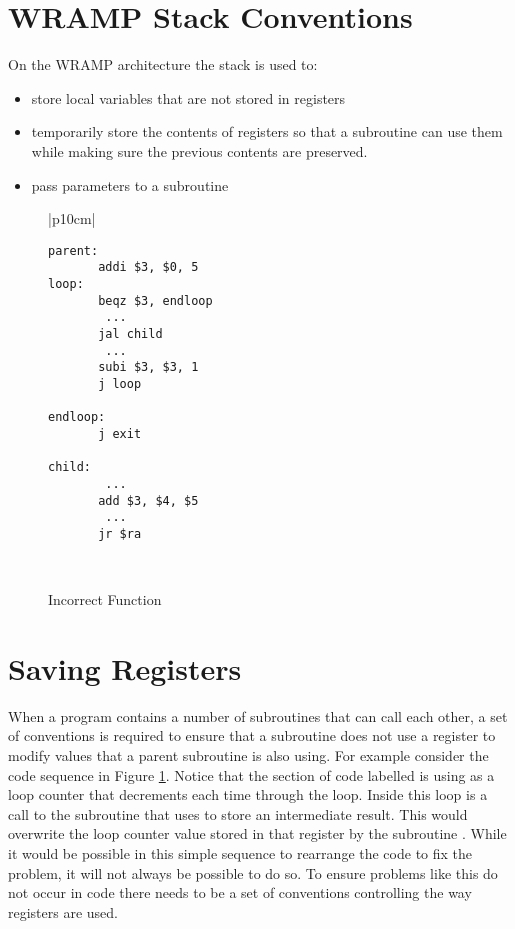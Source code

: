 \section{WRAMP Stack Conventions}
On the WRAMP architecture the stack is used to:

\begin{itemize}
\item store local variables that are not stored in registers
\item temporarily store the contents of registers so that a subroutine can use them while making sure the previous contents are preserved.
\item pass parameters to a subroutine
\end{itemize}

%
%
\begin{figure}[!hbt]
\begin{footnotesize}
\begin{center}
\begin{tabular}{|p{10cm}|}
\hline
\begin{verbatim}
parent:
       addi $3, $0, 5
loop:
       beqz $3, endloop
        ...
       jal child
        ...
       subi $3, $3, 1
       j loop

endloop:
       j exit

child:
        ...
       add $3, $4, $5
        ...
       jr $ra
\end{verbatim}
\\
\hline
\end{tabular}
\end{center}
\end{footnotesize}
\caption{Incorrect Function} 
\label{fig:problemcode}
\end{figure}

\section{Saving Registers}
When a program contains a number of subroutines that can call each
other, a set of conventions is required to ensure that a subroutine
does not use a register to modify values that a parent subroutine is
also using. For example consider the code sequence in Figure
\ref{fig:problemcode}. Notice that the section of code labelled
 is using  as a loop counter that decrements each
time through the loop. Inside this loop is a call to the subroutine
 that uses  to store an intermediate result. This
would overwrite the loop counter value stored in that register by the
subroutine . While it would be possible in this simple
sequence to rearrange the code to fix the problem, it will not always
be possible to do so.  To ensure problems like this do not occur in
code there needs to be a set of conventions controlling the way
registers are used.



